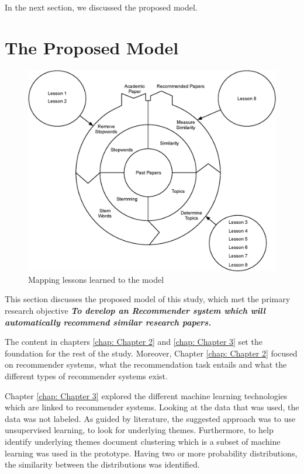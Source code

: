 In the next section, we discussed the proposed model.

\section{The Proposed Model}

\begin{figure}[htbp]
\centering
\includegraphics[width=15cm]{./figures/Lesson.eps}
\caption{Mapping lessons learned to the model}
\label{fig:processing1}
\end{figure}

This section discusses the proposed model of this study, which met the primary research objective \textbf{\textit{To develop an Recommender system which will automatically recommend similar research papers.}}

The content in chapters \ref{chap: Chapter 2} and \ref{chap: Chapter 3} set the foundation for the rest of the study. Moreover, Chapter \ref{chap: Chapter 2} focused on recommender systems, what the recommendation task entails and what the different types of recommender systems exist. 

Chapter \ref{chap: Chapter 3} explored the different machine learning technologies which are linked to recommender systems. Looking at the data that was used, the data was not labeled. As guided by literature, the suggested approach was to use unsupervised learning, to look for underlying themes. Furthermore, to help identify underlying themes document clustering which is a subset of machine learning was used in the prototype. Having two or more probability distributions, the similarity between the distributions was identified.

